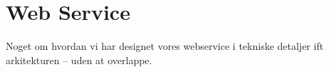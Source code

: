\chapter{Web Service}

Noget om hvordan vi har designet vores webservice i tekniske detaljer ift arkitekturen -- uden at overlappe.